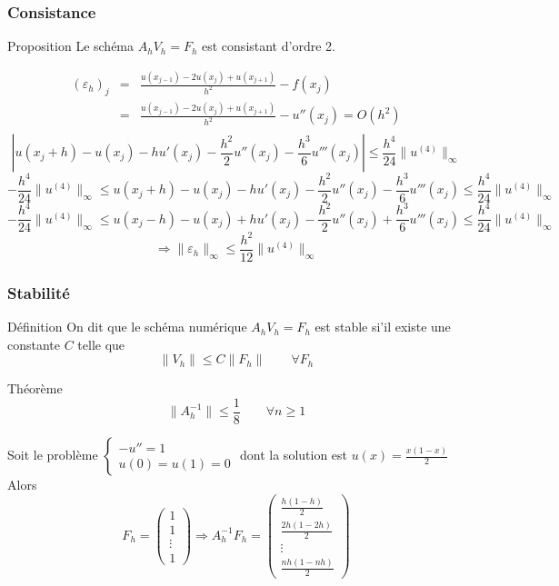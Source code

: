 \documentclass{beamer}
\begin{document}
 \begin{frame}
  \frametitle{Consistance}
  \begin{block}{Proposition}
  Le schéma $A_h V_h =F_h$  est consistant d'ordre 2.
  \end{block}
  \[\begin{array}{lll}
  (\varepsilon_h)_j&=&\displaystyle  \frac{u(x_{j-1})-2u(x_j)+u(x_{j+1})}{h^2}-f(x_j)\\
  &=&\displaystyle   \frac{u(x_{j-1})-2u(x_j)+u(x_{j+1})}{h^2}-u''(x_j)=O(h^2)\\
  \end{array}\]
  \[\left|u(x_j+h)-u(x_j)-hu'(x_j)-\frac{h^2}{2}u''(x_j)-\frac{h^3}{6}u'''(x_j)\right|\leq \frac{h^4}{24}\|u^{(4)}\|_{\infty}\]
  \[- \frac{h^4}{24}\|u^{(4)}\|_{\infty}\leq u(x_j+h)-u(x_j)-hu'(x_j)-\frac{h^2}{2}u''(x_j)-\frac{h^3}{6}u'''(x_j)\leq \frac{h^4}{24}\|u^{(4)}\|_{\infty}\]
   \[- \frac{h^4}{24}\|u^{(4)}\|_{\infty}\leq u(x_j-h)-u(x_j)+hu'(x_j)-\frac{h^2}{2}u''(x_j)+\frac{h^3}{6}u'''(x_j)\leq \frac{h^4}{24}\|u^{(4)}\|_{\infty}\]
 \[\Longrightarrow \|\varepsilon_h\|_{\infty} \leq \frac{h^2}{12} \|u^{(4)}\|_{\infty}\] 
 
 \end{frame} 

 
 \begin{frame}
  \frametitle{Stabilité}
  \begin{block}{Définition}
  On dit que le schéma numérique $A_h V_h =F_h$  est stable si'il existe une constante $C$ telle que
  \[\|V_h\|\leq C\|F_h\|  \qquad \forall F_h\]
  \end{block}
  \begin{block}{Théorème}
   \[\|A_h^{-1}\|\leq \frac{1}{8}  \qquad \forall n\geq 1\]
  \end{block}
   Soit le problème 
   $\left\{\begin{array}{l}
   -u''=1\\
   u(0)=u(1)=0
   \end{array}\right.$ dont la solution est $u(x)=\frac{x(1-x)}{2}$
   Alors 
   \[F_h=\left(\begin{array}{c}1\\1\\ \vdots \\1 \end{array}\right)\Longrightarrow A_h^{-1}F_h = 
   \left(\begin{array}{c}\frac{h(1-h)}{2}\\\frac{2h(1-2h)}{2}\\ \vdots\\ \frac{nh(1-nh)}{2} \end{array}\right)
   \]
  \end{frame} 
 
\end{document}
